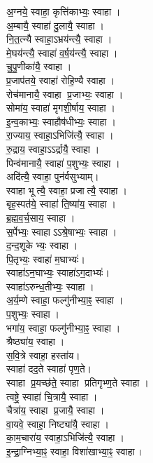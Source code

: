 अ॒ग्नये॒ स्वाहा॒ कृत्ति॑काभ्यः॒ स्वाहा।\\
अ॒म्बायै॒ स्वाहा॑ दु॒लायै॒ स्वाहा।\\
नि॒त॒त्न्यै स्वाहा॒ऽभ्रय॑न्त्यै॒ स्वाहा।\\
मे॒घय॑न्त्यै॒ स्वाहा॑ व॒र्ष॒य॑न्त्यै॒ स्वाहा।\\
चु॒पु॒णीका॑यै॒ स्वाहा।\\
प्र॒जाप॑तये॒ स्वाहा॑ रोहि॒ण्यै स्वाहा।\\
रोच॑मानायै॒ स्वाहा प्र॒जाभ्यः॒ स्वाहा।\\
सोमा॑य॒ स्वाहा॑ मृगशी॒र्षाय॒ स्वाहा।\\
इ॒न्व॒काभ्यः॒ स्वाहौष॑धीभ्यः॒ स्वाहा।\\
रा॒ज्याय॒ स्वाहा॒ऽभिजि॑त्यै॒ स्वाहा।\\
रु॒द्राय॒ स्वाहा॒ऽऽर्द्रायै॒ स्वाहा।\\
पिन्व॑मानायै॒ स्वाहा॑ प॒शुभ्यः॒ स्वाहा।\\
अदि॑त्यै॒ स्वाहा॒ पुन॑र्वसुभ्याम्।\\
स्वाहा भूत्यै॒ स्वाहा॒ प्रजात्यै॒ स्वाहा।\\
बृह॒स्पत॑ये॒ स्वाहा॑ ति॒ष्या॑य॒ स्वाहा।\\
ब्र॒ह्म॒व॒र्च॒साय॒ स्वाहा।\\
स॒र्पेभ्यः॒ स्वाहाऽऽश्रे॒षाभ्यः॒ स्वाहा।\\
द॒न्द॒शूकेभ्यः॒ स्वाहा।\\
पि॒तृभ्यः॒ स्वाहा॑ म॒घाभ्यः॑।\\
स्वाहा॑ऽन॒घाभ्यः॒ स्वाहा॑ऽग॒दाभ्यः॑।\\
स्वाहा॑ऽरुन्ध॒तीभ्यः॒ स्वाहा।\\
अ॒र्य॒म्णे स्वाहा॒ फल्गु॑नीभ्या॒ꣴ॒ स्वाहा।\\
प॒शुभ्यः॒ स्वाहा।\\
भगा॑य॒ स्वाहा॒ फल्गु॑नीभ्या॒ꣴ॒ स्वाहा।\\
श्रैष्ठ्या॑य॒ स्वाहा।\\
स॒वि॒त्रे स्वाहा॒ हस्ता॑य।\\
स्वाहा॑ दद॒ते स्वाहा॑ पृण॒ते।\\
स्वाहा प्र॒यच्छ॑ते॒ स्वाहा प्रतिगृभ्ण॒ते स्वाहा।\\
त्वष्ट्रे॒ स्वाहा॑ चि॒त्रायै॒ स्वाहा।\\
चैत्रा॑य॒ स्वाहा प्र॒जायै॒ स्वाहा।\\
वा॒यवे॒ स्वाहा॒ निष्ट्या॑यै॒ स्वाहा।\\
का॒म॒चारा॑य॒ स्वाहा॒ऽभिजि॑त्यै॒ स्वाहा।\\
इ॒न्द्रा॒ग्निभ्या॒ꣴ॒ स्वाहा॒ विशा॑खाभ्या॒ꣴ॒ स्वाहा।\\
